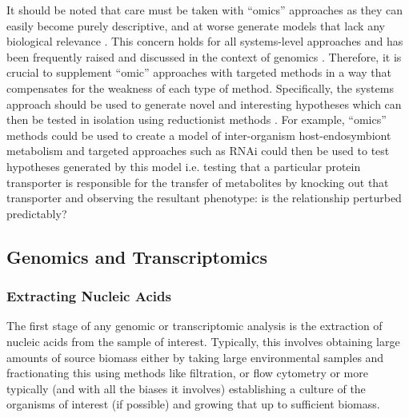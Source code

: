 It should be noted that care must be taken with ``omics'' approaches as they can easily become purely descriptive,
and at worse generate models that lack any biological relevance \citep{Fang2011}.  
This concern holds for all systems-level approaches and has been frequently raised and discussed in the context
of genomics \citep{Dougherty2008}.  Therefore, it is crucial to supplement ``omic'' approaches with targeted
methods in a way that compensates for the weakness of each type of method.
Specifically, the systems approach should be used to generate novel and interesting
hypotheses which can then be tested in isolation using reductionist methods \citep{Casadevall2008}.  
For example, ``omics'' methods could be used to create a model of inter-organism host-endosymbiont
metabolism and targeted approaches such as RNAi could then be used to test hypotheses generated
by this model i.e. testing that a particular protein transporter is responsible
for the transfer of metabolites by knocking out that transporter and observing the resultant phenotype: 
is the relationship perturbed predictably?





\subsection{Genomics and Transcriptomics}

\subsubsection{Extracting Nucleic Acids}

The first stage of any genomic or transcriptomic analysis is the extraction
of nucleic acids from the sample of interest.
Typically, this involves obtaining large amounts of source biomass either by
taking large environmental samples and fractionating this using methods like filtration, 
or flow cytometry or more typically (and with all the biases it involves) establishing
a culture of the organisms of interest (if possible) and growing that up to sufficient biomass.


